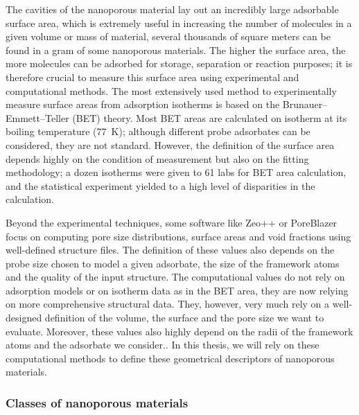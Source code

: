 \documentclass[main.tex]{subfiles}
\begin{document}
The cavities of the nanoporous material lay out an incredibly large adsorbable surface area, which is extremely useful in increasing the number of molecules in a given volume or mass of material, several thousands of square meters can be found in a gram of some nanoporous materials.\autocite{Farha_2012} The higher the surface area, the more molecules can be adsorbed for storage, separation or reaction purposes; it is therefore crucial to measure this surface area using experimental and computational methods. The most extensively used method to experimentally measure surface areas from adsorption isotherms is based on the Brunauer–Emmett–Teller (BET) theory.\autocite{Detsi_2011} Most BET areas are calculated on  isotherm at its boiling temperature (\SI{77}{\kelvin}); although different probe adsorbates can be considered, they are not standard.\autocite{Tian_2017} However, the definition of the surface area depends highly on the condition of measurement but also on the fitting methodology; a dozen isotherms were given to 61 labs for BET area calculation, and the statistical experiment yielded to a high level of disparities in the calculation.\autocite{Osterrieth_2022} 

Beyond the experimental techniques, some software like Zeo++ or PoreBlazer focus on computing pore size distributions, surface areas and void fractions using well-defined structure files.\autocite{Zeo++,PoreBlazer} The definition of these values also depends on the probe size chosen to model a given adsorbate, the size of the framework atoms and the quality of the input structure. The computational values do not rely on adsorption models or on isotherm data as in the BET area, they are now relying on more comprehensive structural data. They, however, very much rely on a well-designed definition of the volume, the surface and the pore size we want to evaluate. Moreover, these values also highly depend on the radii of the framework atoms and the adsorbate we consider.\autocite{Hung_2021}. In this thesis, we will rely on these computational methods to define these geometrical descriptors of nanoporous materials.

\subsubsection{Classes of nanoporous materials}
\end{document}
